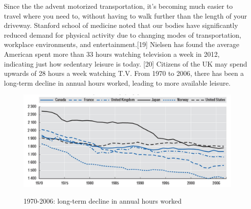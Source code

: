 \documentclass[12pt,article]{IEEEtran}
\begin{document}
	Since the the advent motorized transportation, it’s becoming much easier to travel where you need to, without 
	having to walk further than the length of your driveway. Stanford school of medicine noted that our bodies have 
	significantly reduced demand for physical activity due to changing modes of transportation, workplace environments, 
	and entertainment.[19] 
	Nielsen has found the average American spent more than 33 hours watching television a week in 2012, indicating just 
	how sedentary leisure is today. [20] Citizens of the UK may spend upwards of 28 hours a week watching T.V. From 1970 
	to 2006, there has been a long-term decline in annual hours worked, leading to more available leisure.

	\begin{figure}[htpb]
    	\caption{1970-2006: long-term decline in annual hours worked}
    	\centering
		\vspace{10}
    	\includegraphics[width=.5\textwidth]{hoursworked}
		\cite{22}
	\end{figure}
	
\end{document}
